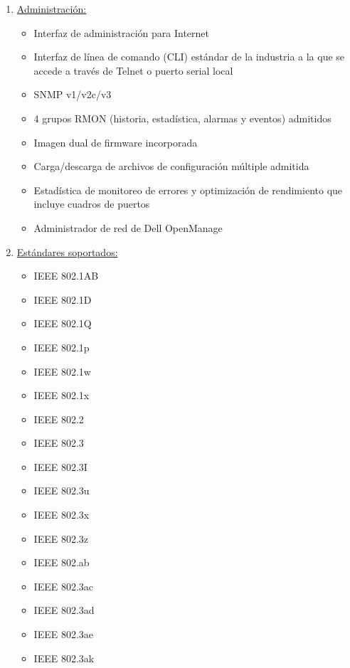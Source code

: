 \begin{enumerate}
\item \underline{Administración:}
\begin{itemize}
  \item Interfaz de administración para Internet
  \item Interfaz de línea de comando (CLI) estándar de la industria a la que se accede a través de Telnet o puerto serial local
  \item SNMP v1/v2c/v3
  \item 4 grupos RMON (historia, estadística, alarmas y eventos) admitidos
  \item Imagen dual de firmware incorporada
  \item Carga/descarga de archivos de configuración múltiple admitida
  \item Estadística de monitoreo de errores y optimización de rendimiento que incluye cuadros de puertos
  \item Administrador de red de Dell OpenManage
\end{itemize}

\item \underline{Estándares soportados:}
\begin{itemize}
  \item IEEE 802.1AB
  \item IEEE 802.1D
  \item IEEE 802.1Q
  \item IEEE 802.1p
  \item IEEE 802.1w
  \item IEEE 802.1x
  \item IEEE 802.2
  \item IEEE 802.3
  \item IEEE 802.3I
  \item IEEE 802.3u
  \item IEEE 802.3x
  \item IEEE 802.3z
  \item IEEE 802.ab
  \item IEEE 802.3ac
  \item IEEE 802.3ad
  \item IEEE 802.3ae
  \item IEEE 802.3ak
\end{itemize}

\end{enumerate}

